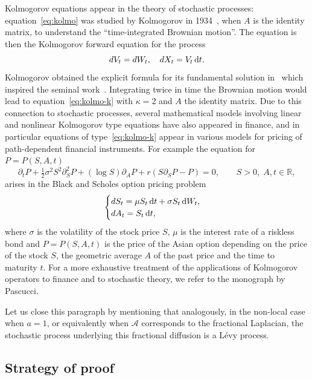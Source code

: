 \documentclass[10pt]{amsart}
\theoremstyle{definition}
\newcommand{\dd}{{\, \mathrm d}}
\let\s\sigma
\let\p\partial
\begin{document}
Kolmogorov equations appear in the theory of stochastic
processes: equation~\eqref{eq:kolmo} was studied by
Kolmogorov in 1934~\cite{kolmogorov}, when $A$ is the identity
matrix, to understand the ``time-integrated Brownian motion''. The
equation is then the Kolmogorov forward equation for the
process
\begin{equation*}
{\rm d} V_t = {\rm d} W_{t}, \quad
{\rm d} X_t = V_{t} \dd t.
\end{equation*}
Kolmogorov obtained the explicit formula for its fundamental solution
in~\cite{kolmogorov} which inspired the seminal
work~\cite{MR0222474}. Integrating twice in time the Brownian motion
would lead to equation~\eqref{eq:kolmo-k} with $\kappa=2$ and $A$
the identity matrix. Due to this connection to stochastic
processes, several mathematical models involving linear and nonlinear Kolmogorov type equations have also appeared in finance, and in particular equations of
type~\eqref{eq:kolmo-k} appear in various models for pricing of
path-dependent financial instruments. For
example the equation for $P=P(S,A,t)$
\begin{equation}
\label{bpv}
\p_t P + \tfrac12 \s^{2} S^2 \p^2_S P + (\log S) \p_{A} P + r
(S \p_{S} P - P) = 0, \qquad S > 0,
\; A, t \in \mathbb{R},
\end{equation}
arises in the Black and Scholes option pricing problem
\begin{equation*}
\begin{cases}
{\rm d} S_t = \mu S_{t} \dd t + \s S_{t} \dd W_{t}, \\
{\rm d} A_t = S_{t} \dd t,
\end{cases}
\end{equation*}
where $\s$ is the volatility of the stock price $S$, $\mu$ is the
interest rate of a riskless bond and $P= P(S, A, t)$ is the price
of the Asian option depending on the price of the stock $S$, the
geometric average $A$ of the past price and the time to maturity
$t$. For a more exhaustive treatment of the applications of
Kolmogorov operators to finance and to stochastic theory, we
refer to the monograph \cite{Pascucci} by Pascucci.

Let us close this paragraph by mentioning that analogously,
in the non-local case when $a = 1$,
or equivalently when $\mathcal A$ corresponds to
the fractional Laplacian, the stochastic
process underlying this fractional diffusion is a Lévy process.

\subsection{Strategy of proof}
\end{document}
